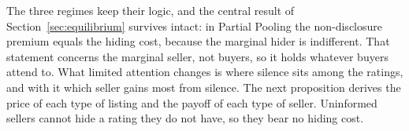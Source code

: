 The three regimes keep their logic, and the central result of Section~\ref{sec:equilibrium} survives intact: in Partial Pooling the non-disclosure premium equals the hiding cost, because the marginal hider is indifferent. That statement concerns the marginal seller, not buyers, so it holds whatever buyers attend to. What limited attention changes is where silence sits among the ratings, and with it which seller gains most from silence. The next proposition derives the price of each type of listing and the payoff of each type of seller. Uninformed sellers cannot hide a rating they do not have, so they bear no hiding cost.
